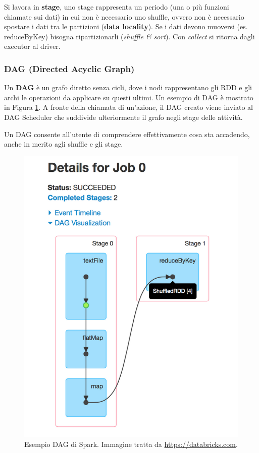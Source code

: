 \documentclass[12pt,italian]{article}
\begin{document}
Si lavora in \textbf{stage}, uno stage rappresenta un periodo (una o più funzioni chiamate sui dati) in cui non è necessario uno shuffle, ovvero non è necessario spostare i dati tra le partizioni (\textbf{data locality}). Se i dati devono muoversi (es. reduceByKey) bisogna ripartizionarli (\textit{shuffle \& sort}).
Con \textit{collect} si ritorna dagli executor al driver.

\subsubsection{DAG (Directed Acyclic Graph) }\label{sec:DAG}
Un \textbf{DAG} è un grafo diretto senza cicli, dove i nodi rappresentano gli RDD e gli archi le operazioni da applicare su questi ultimi. Un esempio di DAG è mostrato in Figura \ref{fig:DAG}.
A fronte della chiamata di un'azione, il DAG creato viene inviato al DAG Scheduler che suddivide ulteriormente il grafo negli stage delle attività.
\par Un DAG consente all'utente di comprendere effettivamente cosa sta accadendo, anche in merito agli shuffle e gli stage.
\begin{figure}[H]
	\centering 
	\includegraphics[width=0.8\linewidth]{img/DAG.png}
	\caption{Esempio DAG di Spark. Immagine tratta da \url{https://databricks.com}.}
	\label{fig:DAG}
\end{figure}
\end{document}
